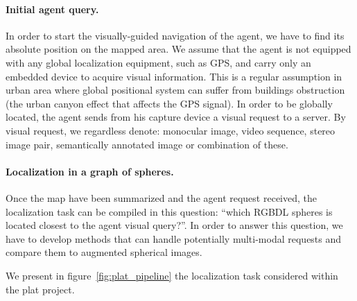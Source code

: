 \paragraph{Initial agent query.}
In order to start the visually-guided navigation of the agent, we have to find its absolute position on the mapped area. We assume that the agent is not equipped with any global localization equipment, such as GPS, and carry only an embedded device to acquire visual information. This is a regular assumption in urban area where global positional system can suffer from buildings obstruction (\eg the urban canyon effect that affects the GPS signal). In order to be globally located, the agent sends from his capture device a visual request to a server. By visual request, we regardless denote: monocular image, video sequence, stereo image pair, semantically annotated image or combination of these.

\paragraph{Localization in a graph of spheres.}
Once the map have been summarized and the agent request received, the localization task can be compiled in this question: ``which RGBDL spheres is located closest to the agent visual query?''. In order to answer this question, we have to develop methods that can handle potentially multi-modal requests and compare them to augmented spherical images.



We present in figure~\ref{fig:plat_pipeline} the localization task considered within the \ac{plat} project.